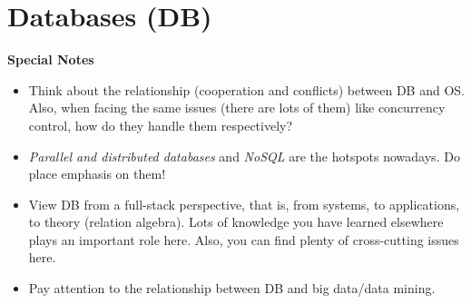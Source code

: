 \documentclass{article}
\begin{document}
\section{Databases (DB)}
\textbf{Special Notes}
\begin{itemize}
    \item Think about the relationship (cooperation and conflicts) between DB and OS.
    Also, when facing the same issues (there are lots of them) like concurrency control, how do they handle them respectively?
    \item \emph{Parallel and distributed databases} and \emph{NoSQL} are the hotspots nowadays.
    Do place emphasis on them!
    \item View DB from a full-stack perspective, that is, from systems, to applications, to theory (relation algebra).
    Lots of knowledge you have learned elsewhere plays an important role here.
    Also, you can find plenty of cross-cutting issues here.
    \item Pay attention to the relationship between DB and big data/data mining.
\end{itemize}
\end{document}
